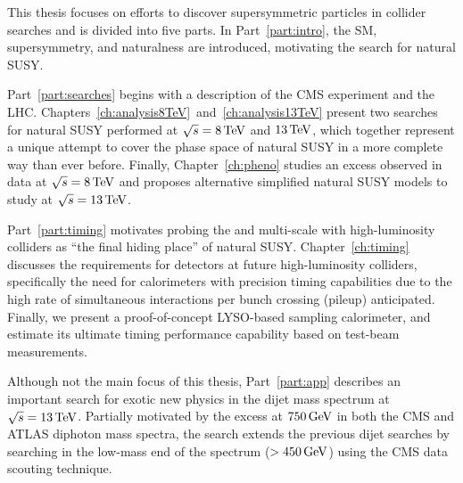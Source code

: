 This thesis focuses on efforts to discover supersymmetric
particles in collider searches and is divided into five parts. In
Part~\ref{part:intro}, the SM, supersymmetry, and naturalness are
introduced, motivating the search for natural SUSY. 

Part~\ref{part:searches} begins with a description of the CMS
experiment and the
LHC. Chapters~\ref{ch:analysis8TeV}~and~\ref{ch:analysis13TeV} present
two searches for natural SUSY performed at $\sqrt{s}=8
\,\text{Te\hspace{-.08em}V}$ and $13 \,\text{Te\hspace{-.08em}V}$, which together represent a unique attempt to cover the phase space of
natural SUSY in a more complete way than ever before. Finally,
Chapter~\ref{ch:pheno} studies an excess observed in data at $\sqrt{s}=8
\,\text{Te\hspace{-.08em}V}$ and proposes alternative simplified natural SUSY models to study
at $\sqrt{s}=13 \,\text{Te\hspace{-.08em}V}$. 

Part~\ref{part:timing} motivates probing the \TeV and multi-\TeV scale
with high-luminosity colliders as ``the final hiding place'' of natural SUSY. Chapter~\ref{ch:timing} discusses the
requirements for detectors at future high-luminosity colliders,
specifically the need for calorimeters with precision
timing capabilities due to the high rate of simultaneous interactions
per bunch crossing (pileup) anticipated. Finally, we present a
proof-of-concept LYSO-based sampling calorimeter, and estimate its
ultimate timing performance capability based on test-beam
measurements.

Although not the main focus of this thesis, Part~\ref{part:app}
describes an important search for exotic new physics in the dijet mass
spectrum at $\sqrt{s}=13 \,\text{Te\hspace{-.08em}V}$. Partially motivated by
the excess at $750 \,\text{Ge\hspace{-.08em}V}$ in both the CMS and ATLAS diphoton mass
spectra, the search extends the previous dijet searches by searching
in the low-mass end of the spectrum ($>450 \,\text{Ge\hspace{-.08em}V}$) using the
CMS data scouting technique.